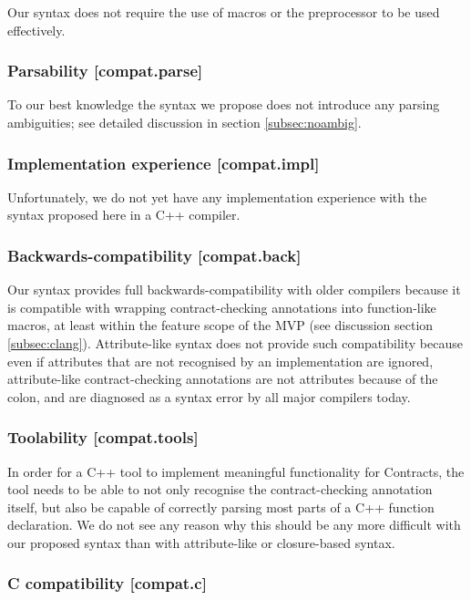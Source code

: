 Our syntax does not require the use of macros or the preprocessor to be used effectively.

\subsubsection{Parsability  [compat.parse]}

To our best knowledge the syntax we propose does not introduce any parsing ambiguities; see detailed discussion in section \ref{subsec:noambig}.

\subsubsection{Implementation experience  [compat.impl]}

Unfortunately, we do not yet have any implementation experience with the syntax proposed here in a C++ compiler.

\subsubsection{Backwards-compatibility  [compat.back]}

Our syntax provides full backwards-compatibility with older compilers because it is compatible with wrapping contract-checking annotations into function-like macros, at least within the feature scope of the MVP (see discussion section \ref{subsec:clang}). Attribute-like syntax does not provide such compatibility because even if attributes that are not recognised by an implementation are ignored, attribute-like contract-checking annotations are not attributes because of the colon, and are diagnosed as a syntax error by all major compilers today.

\subsubsection{Toolability [compat.tools]}

In order for a C++ tool to implement meaningful functionality for Contracts, the tool needs to be able to not only recognise the contract-checking annotation itself, but also be capable of correctly parsing most parts of a C++ function declaration. We do not see any reason why this should be any more difficult with our proposed syntax than with attribute-like or closure-based syntax.

\subsubsection{C compatibility  [compat.c]}

